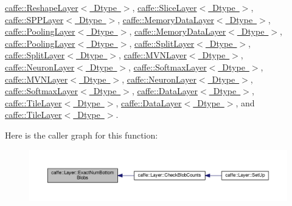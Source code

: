 \mbox{\hyperlink{classcaffe_1_1_reshape_layer_ad97ea6043b01351e85b39b512ae0e489}{caffe\+::\+Reshape\+Layer$<$ Dtype $>$}}, \mbox{\hyperlink{classcaffe_1_1_slice_layer_abfc6e86b0b22c156ddc350168cd7757b}{caffe\+::\+Slice\+Layer$<$ Dtype $>$}}, \mbox{\hyperlink{classcaffe_1_1_s_p_p_layer_a0fcc7996823cba1a468e82b3f9058ff0}{caffe\+::\+S\+P\+P\+Layer$<$ Dtype $>$}}, \mbox{\hyperlink{classcaffe_1_1_memory_data_layer_a05a867526de7e0c6ec4851a97f52a47b}{caffe\+::\+Memory\+Data\+Layer$<$ Dtype $>$}}, \mbox{\hyperlink{classcaffe_1_1_pooling_layer_a07dc8b1c3bfa3a997dd86b4e53f54019}{caffe\+::\+Pooling\+Layer$<$ Dtype $>$}}, \mbox{\hyperlink{classcaffe_1_1_memory_data_layer_a05a867526de7e0c6ec4851a97f52a47b}{caffe\+::\+Memory\+Data\+Layer$<$ Dtype $>$}}, \mbox{\hyperlink{classcaffe_1_1_pooling_layer_a07dc8b1c3bfa3a997dd86b4e53f54019}{caffe\+::\+Pooling\+Layer$<$ Dtype $>$}}, \mbox{\hyperlink{classcaffe_1_1_split_layer_a8ff310ac37e1e79ce6ef8fbc95be0cd9}{caffe\+::\+Split\+Layer$<$ Dtype $>$}}, \mbox{\hyperlink{classcaffe_1_1_split_layer_a8ff310ac37e1e79ce6ef8fbc95be0cd9}{caffe\+::\+Split\+Layer$<$ Dtype $>$}}, \mbox{\hyperlink{classcaffe_1_1_m_v_n_layer_afd9b078a1bb48de9b91f3766edbbf058}{caffe\+::\+M\+V\+N\+Layer$<$ Dtype $>$}}, \mbox{\hyperlink{classcaffe_1_1_neuron_layer_abb6c0e6acd2863baf47d6e6acda6f55f}{caffe\+::\+Neuron\+Layer$<$ Dtype $>$}}, \mbox{\hyperlink{classcaffe_1_1_softmax_layer_afe44488dde78e6bcf6d4bdad97ee4986}{caffe\+::\+Softmax\+Layer$<$ Dtype $>$}}, \mbox{\hyperlink{classcaffe_1_1_m_v_n_layer_afd9b078a1bb48de9b91f3766edbbf058}{caffe\+::\+M\+V\+N\+Layer$<$ Dtype $>$}}, \mbox{\hyperlink{classcaffe_1_1_neuron_layer_abb6c0e6acd2863baf47d6e6acda6f55f}{caffe\+::\+Neuron\+Layer$<$ Dtype $>$}}, \mbox{\hyperlink{classcaffe_1_1_softmax_layer_afe44488dde78e6bcf6d4bdad97ee4986}{caffe\+::\+Softmax\+Layer$<$ Dtype $>$}}, \mbox{\hyperlink{classcaffe_1_1_data_layer_a2b6fa99ededf0863d8bab4a7a46addae}{caffe\+::\+Data\+Layer$<$ Dtype $>$}}, \mbox{\hyperlink{classcaffe_1_1_tile_layer_ac7e0da0e543f134e04b00d8625132b71}{caffe\+::\+Tile\+Layer$<$ Dtype $>$}}, \mbox{\hyperlink{classcaffe_1_1_data_layer_a2b6fa99ededf0863d8bab4a7a46addae}{caffe\+::\+Data\+Layer$<$ Dtype $>$}}, and \mbox{\hyperlink{classcaffe_1_1_tile_layer_ac7e0da0e543f134e04b00d8625132b71}{caffe\+::\+Tile\+Layer$<$ Dtype $>$}}.

Here is the caller graph for this function\+:
\nopagebreak
\begin{figure}[H]
\begin{center}
\leavevmode
\includegraphics[width=350pt]{classcaffe_1_1_layer_a8e5ee0494d85f5f55fc4396537cbc60f_icgraph}
\end{center}
\end{figure}
\mbox{\label{classcaffe_1_1_layer_a64e2ca72c719e4b2f1f9216ccfb0d37f}} 
